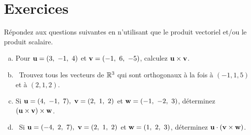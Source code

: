 
\section*{Exercices}


    
 
\begin{prob}\label{prob03.1}  Répondez aux questions suivantes en n'utilisant que le produit vectoriel et/ou le produit scalaire.
\begin{enumerate}[a)]
\item Pour $\mathbf{u}=(3,\ -1,\ 4)$ et $\mathbf{v}=(-1,\ 6,\ -5)$, calculez
$\mathbf{u}\times \mathbf{v}$. \medskip
\item\sov~Trouvez tous les vecteurs de $\mathbb{R}^3$ qui sont orthogonaux à la fois à $(-1, 1, 5)$ et à $(2, 1, 2)$.  \medskip
\item Si  $\uu=(4,\ -1,\ 7),\ \vv=(2,\ 1,\ 2)$ et 
$\mathbf{w}=(-1,\ -2,\ 3)$, déterminez $(\mathbf{u}\times \mathbf{v})\times \mathbf{w}$. \medskip
\item\sov~Si $\uu=(-4,\ 2,\ 7),\ \vv=(2,\ 1,\ 2)$ et 
$\mathbf{w}=(1,\ 2,\ 3)$, déterminez $\mathbf{u}\cdot (\mathbf{v}\times \mathbf{w})$. \medskip
\end{enumerate}

\end{prob}
